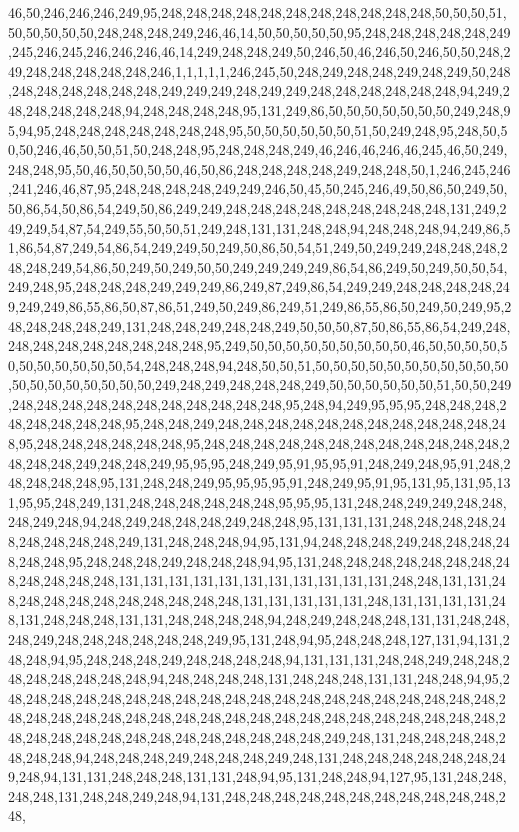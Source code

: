 46,50,246,246,246,249,95,248,248,248,248,248,248,248,248,248,248,248,50,50,50,51,50,50,50,50,50,248,248,248,249,246,46,14,50,50,50,50,50,95,248,248,248,248,248,249,245,246,245,246,246,246,46,14,249,248,248,249,50,246,50,46,246,50,246,50,50,248,249,248,248,248,248,248,246,1,1,1,1,1,246,245,50,248,249,248,248,249,248,249,50,248,248,248,248,248,248,248,249,249,249,248,249,249,248,248,248,248,248,248,94,249,248,248,248,248,248,94,248,248,248,248,95,131,249,86,50,50,50,50,50,50,50,249,248,95,94,95,248,248,248,248,248,248,248,95,50,50,50,50,50,50,51,50,249,248,95,248,50,50,50,246,46,50,50,51,50,248,248,95,248,248,248,249,46,246,46,246,46,245,46,50,249,248,248,95,50,46,50,50,50,50,46,50,86,248,248,248,248,249,248,248,50,1,246,245,246,241,246,46,87,95,248,248,248,248,249,249,246,50,45,50,245,246,49,50,86,50,249,50,50,86,54,50,86,54,249,50,86,249,249,248,248,248,248,248,248,248,248,248,131,249,249,249,54,87,54,249,55,50,50,51,249,248,131,131,248,248,94,248,248,248,94,249,86,51,86,54,87,249,54,86,54,249,249,50,249,50,86,50,54,51,249,50,249,249,248,248,248,248,248,249,54,86,50,249,50,249,50,50,249,249,249,249,86,54,86,249,50,249,50,50,54,249,248,95,248,248,248,249,249,249,86,249,87,249,86,54,249,249,248,248,248,248,249,249,249,86,55,86,50,87,86,51,249,50,249,86,249,51,249,86,55,86,50,249,50,249,95,248,248,248,248,249,131,248,248,249,248,248,249,50,50,50,87,50,86,55,86,54,249,248,248,248,248,248,248,248,248,248,95,249,50,50,50,50,50,50,50,50,50,46,50,50,50,50,50,50,50,50,50,50,50,54,248,248,248,94,248,50,50,51,50,50,50,50,50,50,50,50,50,50,50,50,50,50,50,50,50,50,50,249,248,249,248,248,248,249,50,50,50,50,50,50,51,50,50,249,248,248,248,248,248,248,248,248,248,248,248,95,248,94,249,95,95,95,248,248,248,248,248,248,248,248,95,248,248,249,248,248,248,248,248,248,248,248,248,248,248,248,95,248,248,248,248,248,248,95,248,248,248,248,248,248,248,248,248,248,248,248,248,248,248,249,248,248,249,95,95,95,248,249,95,91,95,95,91,248,249,248,95,91,248,248,248,248,248,95,131,248,248,249,95,95,95,95,91,248,249,95,91,95,131,95,131,95,131,95,95,248,249,131,248,248,248,248,248,248,95,95,95,131,248,248,249,249,248,248,248,249,248,94,248,249,248,248,248,249,248,248,95,131,131,131,248,248,248,248,248,248,248,248,248,249,131,248,248,248,94,95,131,94,248,248,248,249,248,248,248,248,248,248,95,248,248,248,249,248,248,248,94,95,131,248,248,248,248,248,248,248,248,248,248,248,248,131,131,131,131,131,131,131,131,131,131,131,248,248,131,131,248,248,248,248,248,248,248,248,248,248,131,131,131,131,131,248,131,131,131,131,248,131,248,248,248,131,131,248,248,248,248,94,248,249,248,248,248,131,131,248,248,248,249,248,248,248,248,248,248,249,95,131,248,94,95,248,248,248,127,131,94,131,248,248,94,95,248,248,248,249,248,248,248,248,94,131,131,131,248,248,249,248,248,248,248,248,248,248,248,94,248,248,248,248,131,248,248,248,131,131,248,248,94,95,248,248,248,248,248,248,248,248,248,248,248,248,248,248,248,248,248,248,248,248,248,248,248,248,248,248,248,248,248,248,248,248,248,248,248,248,248,248,248,248,248,248,248,248,248,248,248,248,248,248,248,248,248,249,248,131,248,248,248,248,248,248,248,94,248,248,248,249,248,248,248,249,248,131,248,248,248,248,248,248,249,248,94,131,131,248,248,248,131,131,248,94,95,131,248,248,94,127,95,131,248,248,248,248,131,248,248,249,248,94,131,248,248,248,248,248,248,248,248,248,248,248,248,